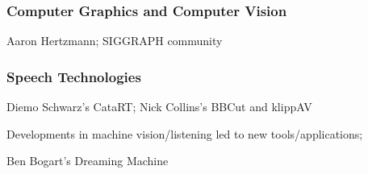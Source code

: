 \documentclass[a4paper,10pt,final]{ThesisStyle}
\begin{document}
\subsubsection{Computer Graphics and Computer Vision}

Aaron Hertzmann; SIGGRAPH community

\subsubsection{Speech Technologies}

Diemo Schwarz's CataRT; Nick Collins's BBCut and klippAV

Developments in machine vision/listening led to new tools/applications;



Ben Bogart's Dreaming Machine

\end{document}
